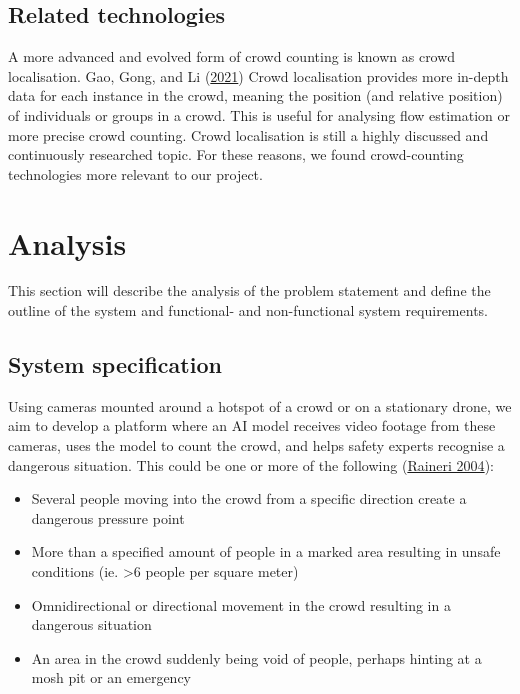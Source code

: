 \documentclass[
]{article}
\providecommand{\tightlist}{%
  \setlength{\itemsep}{0pt}\setlength{\parskip}{0pt}}\usepackage{longtable,booktabs,array}
\begin{document}
\hypertarget{related-technologies}{%
\subsection{Related technologies}\label{related-technologies}}

A more advanced and evolved form of crowd counting is known as crowd
localisation. Gao, Gong, and Li
(\protect\hyperlink{ref-DBLP:journalsux2fcorrux2fabs-2108-00584}{2021})
Crowd localisation provides more in-depth data for each instance in the
crowd, meaning the position (and relative position) of individuals or
groups in a crowd. This is useful for analysing flow estimation or more
precise crowd counting. Crowd localisation is still a highly discussed
and continuously researched topic. For these reasons, we found
crowd-counting technologies more relevant to our project.

\newpage{}

\hypertarget{sec-analysis}{%
\section{Analysis}\label{sec-analysis}}

This section will describe the analysis of the problem statement and
define the outline of the system and functional- and non-functional
system requirements.

\hypertarget{system-specification}{%
\subsection{System specification}\label{system-specification}}

Using cameras mounted around a hotspot of a crowd or on a stationary
drone, we aim to develop a platform where an AI model receives video
footage from these cameras, uses the model to count the crowd, and helps
safety experts recognise a dangerous situation. This could be one or
more of the following (\protect\hyperlink{ref-inproceedings}{Raineri
2004}):

\begin{itemize}
\tightlist
\item
  Several people moving into the crowd from a specific direction create
  a dangerous pressure point
\item
  More than a specified amount of people in a marked area resulting in
  unsafe conditions (ie. \textgreater6 people per square meter)
\item
  Omnidirectional or directional movement in the crowd resulting in a
  dangerous situation
\item
  An area in the crowd suddenly being void of people, perhaps hinting at
  a mosh pit or an emergency
\end{itemize}
\end{document}
